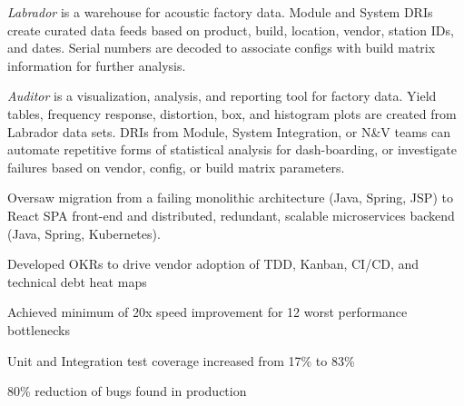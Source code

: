 \documentclass[]{jhearn-resume}
\begin{document}
\begin{minipage}[t]{0.64\textwidth}
\begin{tightemize}
	\begin{tightemize}
	\vspace{\topsep}
	\item \emph{Labrador} is a warehouse for acoustic factory data. Module and System DRIs create curated data feeds based on product, build, location, vendor, station IDs, and dates. Serial numbers are decoded to associate configs with build matrix information for further analysis.
	\item \emph{Auditor} is a visualization, analysis, and reporting tool for factory data. Yield tables, frequency response, distortion, box, and histogram plots are created from Labrador data sets. DRIs from Module, System Integration, or N\&V teams can automate repetitive forms of statistical analysis for dash-boarding, or investigate failures based on vendor, config, or build matrix parameters.
	\item Oversaw migration from a failing monolithic architecture (Java, Spring, JSP) to React SPA front-end and distributed, redundant, scalable microservices backend (Java, Spring, Kubernetes).
	\item Developed OKRs to drive vendor adoption of TDD, Kanban, CI/CD, and technical debt heat maps
	\item Achieved minimum of 20x speed improvement for 12 worst performance bottlenecks
	\item Unit and Integration test coverage increased from 17\% to 83\%
	\item 80\% reduction of bugs found in production
	\end{tightemize}
\end{tightemize}
\sectionsep


\end{minipage} 
\hfill
\end{document}
